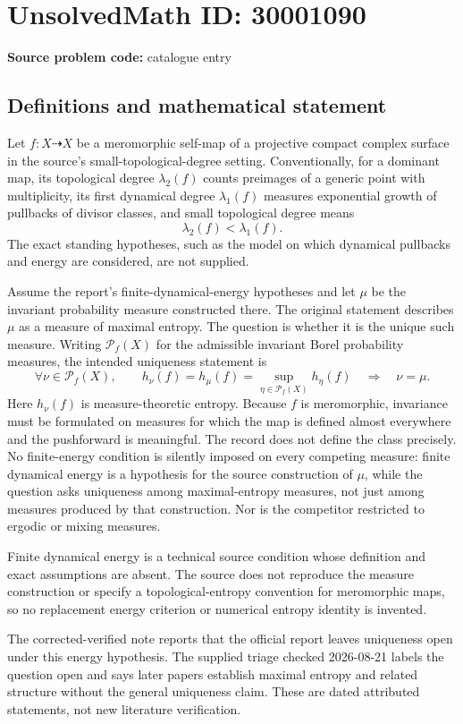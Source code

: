 \documentclass[11pt]{article}
\begin{document}
\section*{UnsolvedMath ID: 30001090}
\textbf{Source problem code:} catalogue entry
\subsection{Definitions and mathematical statement}
Let $f:X\dashrightarrow X$ be a meromorphic self-map of a projective compact complex surface in the source's small-topological-degree setting. Conventionally, for a dominant map, its topological degree $\lambda_2(f)$ counts preimages of a generic point with multiplicity, its first dynamical degree $\lambda_1(f)$ measures exponential growth of pullbacks of divisor classes, and small topological degree means
\[
\lambda_2(f)<\lambda_1(f).
\]
The exact standing hypotheses, such as the model on which dynamical pullbacks and energy are considered, are not supplied.

Assume the report's finite-dynamical-energy hypotheses and let $\mu$ be the invariant probability measure constructed there. The original statement describes $\mu$ as a measure of maximal entropy. The question is whether it is the unique such measure. Writing $\mathcal P_f(X)$ for the admissible invariant Borel probability measures, the intended uniqueness statement is
\[
\forall\nu\in\mathcal P_f(X),\qquad
h_\nu(f)=h_\mu(f)=\sup_{\eta\in\mathcal P_f(X)}h_\eta(f)
\quad\Longrightarrow\quad \nu=\mu.
\]
Here $h_\nu(f)$ is measure-theoretic entropy. Because $f$ is meromorphic, invariance must be formulated on measures for which the map is defined almost everywhere and the pushforward is meaningful. The record does not define the class precisely. No finite-energy condition is silently imposed on every competing measure: finite dynamical energy is a hypothesis for the source construction of $\mu$, while the question asks uniqueness among maximal-entropy measures, not just among measures produced by that construction. Nor is the competitor restricted to ergodic or mixing measures.

Finite dynamical energy is a technical source condition whose definition and exact assumptions are absent. The source does not reproduce the measure construction or specify a topological-entropy convention for meromorphic maps, so no replacement energy criterion or numerical entropy identity is invented.

The corrected-verified note reports that the official report leaves uniqueness open under this energy hypothesis. The supplied triage checked 2026-08-21 labels the question open and says later papers establish maximal entropy and related structure without the general uniqueness claim. These are dated attributed statements, not new literature verification.
\end{document}

